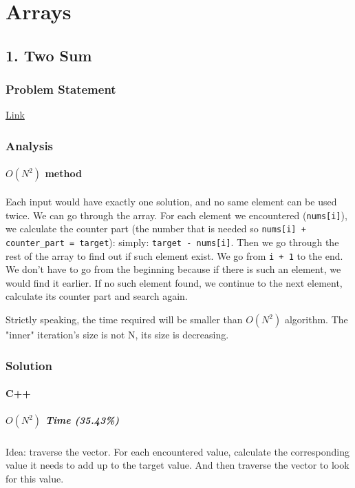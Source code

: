 \documentclass[12pt]{book}
\date{\today}
\title{}
\begin{document}
\tableofcontents


\part{Arrays}
\label{sec:org961a0a8}
\chapter{1. Two Sum}
\label{sec:org995b05b}
\section{Problem Statement}
\label{sec:org6b7f63f}
\href{https://leetcode.com/problems/two-sum/}{Link}
\section{Analysis}
\label{sec:org49be516}
\subsection{\(O(N^2)\) method}
\label{sec:orge41b2c0}
Each input would have exactly one solution, and no same element can be used twice. We can go through the array. For each element we encountered (\texttt{nums[i]}), we calculate the counter part (the number that is needed so \texttt{nums[i] + counter\_part = target}): simply: \texttt{target - nums[i]}. Then we go through the rest of the array to find out if such element exist. We go from \texttt{i + 1} to the end. We don't have to go from the beginning because if there is such an element, we would find it earlier. If no such element found, we continue to the next element, calculate its counter part and search again.

Strictly speaking, the time required will be smaller than \(O(N^2)\) algorithm. The "inner" iteration's size is not N, its size is decreasing.

\section{Solution}
\label{sec:orgf5cdc94}
\subsection{C++}
\label{sec:org5411238}
\subsubsection{\(O(N^2)\) Time (35.43\%)}
\label{sec:org5d1654e}
Idea: traverse the vector. For each encountered value, calculate the corresponding value it needs to add up to the target value. And then traverse the vector to look for this value.
\end{document}
